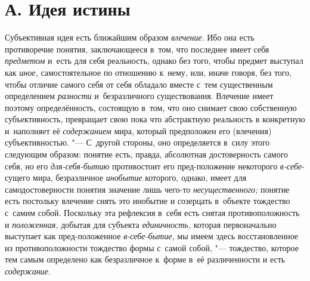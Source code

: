 \section[А. Идея истины]{А. Идея истины}

Субъективная идея есть ближайшим образом {\em влечение}. Ибо она
есть противоречие понятия, заключающееся в~том, что последнее имеет себя
{\em предметом} и~есть
для себя реальность, однако без того, чтобы предмет выступал как {\em иное,}
самостоятельное по отношению к~нему, или, иначе говоря, без
того, чтобы отличие самого себя от себя обладало вместе с~тем существенным
определением {\em разности} и~безразличного существования. Влечение имеет
поэтому определённость, состоящую в~том, что оно снимает свою собственную
субъективность, превращает свою пока что абстрактную реальность
в конкретную и~наполняет её {\em содержанием} мира,
который предположен его (влечения) субъективностью. "--- С~другой
стороны, оно определяется в~силу этого следующим образом: понятие
есть, правда, абсолютная достоверность самого себя, но его
{\em для-себя-бытию} противостоит его пред-положение некоторого
{\em в-себе}-сущего мира, безразличное {\em инобытие}
которого, однако, имеет для самодостоверности понятия
значение лишь чего-то {\em несущественного;}
понятие есть постольку влечение снять это инобытие и
созерцать в~объекте тождество с~самим собой. Поскольку эта рефлексия в~себя
есть снятая противоположность и {\em положенная,} добытая
для субъекта {\em единичность,} которая первоначально выступает как
пред-положенное {\em в-себе-бытие,} мы
имеем здесь восстановленное из противоположности тождество формы с~самой
собой, "--- тождество, которое тем самым
определено как безразличное к~форме в~её различенности и
есть {\em содержание}.

